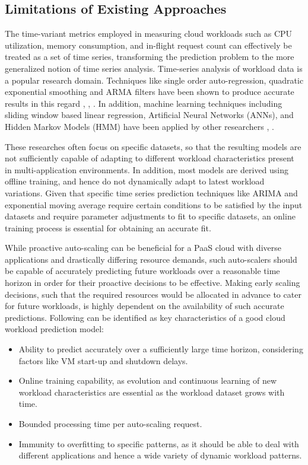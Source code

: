 \subsection{Limitations of Existing Approaches}

The time-variant metrics employed in measuring cloud workloads such as CPU utilization, memory consumption, and in-flight request count can effectively be treated as a set of time series, transforming the prediction problem to the more generalized notion of time series analysis. Time-series analysis of workload data is a popular research domain. Techniques like single order auto-regression, quadratic exponential smoothing and ARMA filters have been shown to produce accurate results in this regard \cite{Roy_2011}, \cite{Kupferman_2009}, \cite{Mi_2010}. In addition, machine learning techniques including sliding window based linear regression, Artificial Neural Networks (ANNs), and Hidden Markov Models (HMM) have been applied by other researchers \cite{Yang_2013}, \cite{Khan_2012}.

These researches often focus on specific datasets, so that the resulting models are not sufficiently capable of adapting to different workload characteristics present in multi-application environments. In addition, most models are derived using offline training, and hence do not dynamically adapt to latest workload variations. Given that specific time series prediction techniques like ARIMA and exponential moving average require certain conditions to be satisfied by the input datasets and require parameter adjustments to fit to specific datasets, an online training process is essential for obtaining an accurate fit.

While proactive auto-scaling can be beneficial for a PaaS cloud with diverse applications and drastically differing resource demands, such auto-scalers should be capable of accurately predicting future workloads over a reasonable time horizon in order for their proactive decisions to be effective. Making early scaling decisions, such that the required resources would be allocated in advance to cater for future workloads, is highly dependent on the availability of such accurate predictions. Following can be identified as key characteristics of a good cloud workload prediction model:

\begin{itemize}
\item Ability to predict accurately over a sufficiently large time horizon, considering factors like VM start-up and shutdown delays.
\item Online training capability, as evolution and continuous learning of new workload characteristics are essential as the workload dataset grows with time.
\item Bounded processing time per auto-scaling request.
\item Immunity to overfitting to specific patterns, as it should be able to deal with different applications and hence a wide variety of dynamic workload patterns.
\end{itemize}
